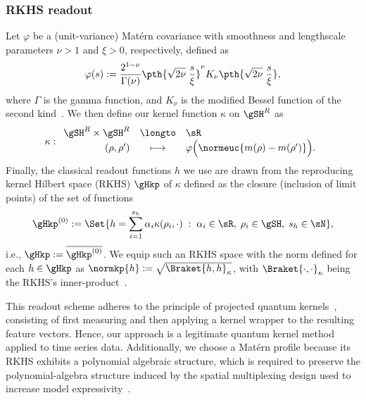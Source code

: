 \subsubsection{RKHS readout}
Let $\varphi$ be a (unit-variance) Mat\'ern covariance with smoothness and lengthscale parameters $\nu > 1$ and $\xi > 0$, respectively, defined as
\begin{equation}\label{eq:matern-profile}
    \varphi(s) := \frac{2^{1-\nu}}{\Gamma(\nu)} \pth{\sqrt{2 \nu}\; \frac{s}{\xi}}^\nu K_\nu\pth{\sqrt{2\nu} \; \frac{s}{\xi}},
\end{equation}
where $\Gamma$ is the gamma function, and $K_\nu$ is the modified Bessel function of the second kind~\cite{genton2001classes}. We then define our kernel function $\kappa$ on $\gSH^R$ as
\begin{equation}\label{eq:matern-kernel}
    \kappa: 
    \begin{array}{rcl}
    \gSH^R \times \gSH^R &\longto& \sR\\
    (\rho, \rho') &\longmapsto& 
        \varphi \Big(\normeuc{m(\rho)-m(\rho')} \Big).
    \end{array}
\end{equation}
Finally, the classical readout functions $h$ we use are drawn from the reproducing kernel Hilbert space (RKHS) $\gHkp$ of $\kappa$ defined as the closure (inclusion of limit points) of the set of functions~\citep{Hofmann_Schölkopf_Smola_2008}
\begin{equation}
    \gHkp^{(0)} := \Set{h = \sum_{i=1}^{s_h} \alpha_i \kappa(\rho_i, \cdot) \;:\;  \alpha_i \in \sR, \; \rho_i \in \gSH, \; s_h \in \sN},
\end{equation}
i.e., $\gHkp := \overline{\gHkp^{(0)}}$. We equip such an RKHS space with the norm defined for each $h \in \gHkp$ as $\normkp{h} := \sqrt{\Braket{h, h}_\kappa}$, with $\Braket{\cdot, \cdot}_\kappa$ being the RKHS's inner-product~\cite{Hofmann_Schölkopf_Smola_2008}.

This readout scheme adheres to the principle of projected quantum kernels~\cite{Huang_Broughton_Mohseni_Babbush_Boixo_Neven_McClean_2021}, consisting of first measuring and then applying a kernel wrapper to the resulting feature vectors. Hence, our approach is a legitimate quantum kernel method applied to time series data. Additionally, we choose a Mat\'ern profile because its RKHS exhibits a polynomial algebraic structure, which is required to preserve the polynomial-algebra structure induced by the spatial multiplexing design used to increase model expressivity~\cite{Monzani_Prati_2025}.

